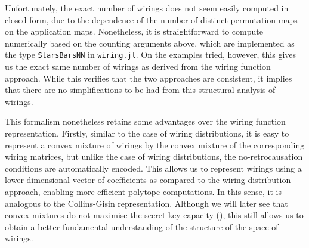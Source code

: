 \documentclass[10pt, a4paper]{article}
\numberwithin{equation}{section} %
\theoremstyle{definition}
\theoremstyle{plain}
\newcommand{\?}{\mathrel{?}} %
\begin{document}
                  Unfortunately, the exact number of wirings does not seem easily computed in closed form, due to the dependence of the number of distinct permutation maps on the application maps. Nonetheless, it is straightforward to compute numerically based on the counting arguments above, which are implemented as the type \verb`StarsBarsNN` in \verb`wiring.jl`. On the examples tried, however, this gives us the exact same number of wirings as derived from the wiring function approach. While this verifies that the two approaches are consistent, it implies that there are no simplifications to be had from this structural analysis of wirings.

                  This formalism nonetheless retains some advantages over the wiring function representation. Firstly, similar to the case of wiring distributions, it is easy to represent a convex mixture of wirings by the convex mixture of the corresponding wiring matrices, but unlike the case of wiring distributions, the no-retrocausation conditions are automatically encoded. This allows us to represent wirings using a lower-dimensional vector of coefficients as compared to the wiring distribution approach, enabling more efficient polytope computations. In this sense, it is analogous to the Collins-Gisin representation. Although we will later see that convex mixtures do not maximise the secret key capacity (), this still allows us to obtain a better fundamental understanding of the structure of the space of wirings.
\end{document}
